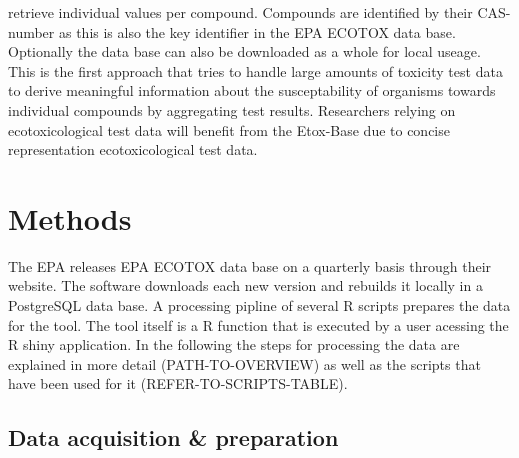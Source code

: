 \documentclass[english]{article}
\newcommand{\etoxbase}{Etox-Base}
\newcommand{\epa}{EPA ECOTOX data base}
\begin{document}
retrieve individual values per compound. Compounds are identified by their CAS-number as this is also the key identifier in the \epa{}. Optionally the data base can also be downloaded as a whole for local useage. This is the first approach that tries to handle large amounts of toxicity test data to derive meaningful information about the susceptability of organisms towards individual compounds by aggregating test results. Researchers relying on ecotoxicological test data will benefit from the \etoxbase{} due to concise representation ecotoxicological test data.

\section*{Methods}


The EPA releases \epa{} on a quarterly basis through their website. The software downloads each new version and rebuilds it locally in a PostgreSQL data base. A processing pipline of several R \cite{r_core_team_r_2017} scripts prepares the data for the tool. The tool itself is a R function that is executed by a user acessing the R shiny \citep{chang_shiny_2018} application. In the following the steps for processing the data are explained in more detail (PATH-TO-OVERVIEW) as well as the scripts that have been used for it (REFER-TO-SCRIPTS-TABLE).

\subsection*{Data acquisition \& preparation}
\end{document}

